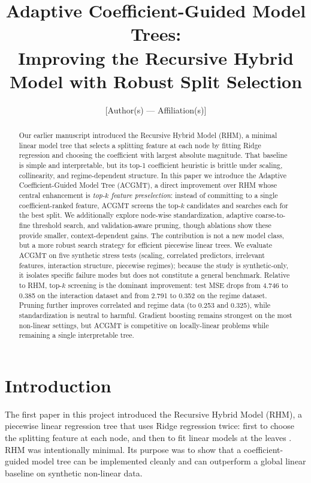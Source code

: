 \documentclass[11pt,a4paper]{article}
\title{Adaptive Coefficient-Guided Model Trees:\\
Improving the Recursive Hybrid Model with Robust Split Selection}
\author{[Author(s) --- Affiliation(s)]}
\date{}
\begin{document}
\maketitle

\begin{abstract}
Our earlier manuscript introduced the Recursive Hybrid Model (RHM), a minimal linear model tree that selects a splitting feature at each node by fitting Ridge regression and choosing the coefficient with largest absolute magnitude. That baseline is simple and interpretable, but its top-1 coefficient heuristic is brittle under scaling, collinearity, and regime-dependent structure. In this paper we introduce the Adaptive Coefficient-Guided Model Tree (ACGMT), a direct improvement over RHM whose central enhancement is \emph{top-$k$ feature preselection}: instead of committing to a single coefficient-ranked feature, ACGMT screens the top-$k$ candidates and searches each for the best split. We additionally explore node-wise standardization, adaptive coarse-to-fine threshold search, and validation-aware pruning, though ablations show these provide smaller, context-dependent gains. The contribution is not a new model class, but a more robust search strategy for efficient piecewise linear trees. We evaluate ACGMT on five synthetic stress tests (scaling, correlated predictors, irrelevant features, interaction structure, piecewise regimes); because the study is synthetic-only, it isolates specific failure modes but does not constitute a general benchmark. Relative to RHM, top-$k$ screening is the dominant improvement: test MSE drops from 4.746 to 0.385 on the interaction dataset and from 2.791 to 0.352 on the regime dataset. Pruning further improves correlated and regime data (to 0.253 and 0.325), while standardization is neutral to harmful. Gradient boosting remains strongest on the most non-linear settings, but ACGMT is competitive on locally-linear problems while remaining a single interpretable tree.
\end{abstract}

\section{Introduction}

The first paper in this project introduced the Recursive Hybrid Model (RHM), a piecewise linear regression tree that uses Ridge regression twice: first to choose the splitting feature at each node, and then to fit linear models at the leaves \citep{rhm2026}. RHM was intentionally minimal. Its purpose was to show that a coefficient-guided model tree can be implemented cleanly and can outperform a global linear baseline on synthetic non-linear data.
\end{document}
